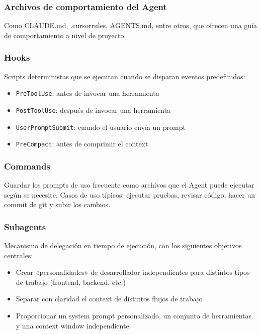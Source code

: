 \documentclass[a4paper]{article}
\begin{document}
\subsubsection{Archivos de comportamiento del Agent}

Como CLAUDE.md, .cursorrules, AGENTS.md, entre otros, que ofrecen una guía de comportamiento a nivel de proyecto.

\subsubsection{Hooks}

Scripts deterministas que se ejecutan cuando se disparan eventos predefinidos:
\begin{itemize}
    \item \texttt{PreToolUse}: antes de invocar una herramienta
    \item \texttt{PostToolUse}: después de invocar una herramienta
    \item \texttt{UserPromptSubmit}: cuando el usuario envía un prompt
    \item \texttt{PreCompact}: antes de comprimir el context
\end{itemize}

\subsubsection{Commands}

Guardar los prompts de uso frecuente como archivos que el Agent puede ejecutar según se necesite. Casos de uso típicos: ejecutar pruebas, revisar código, hacer un commit de git y subir los cambios.

\subsubsection{Subagents}

Mecanismo de delegación en tiempo de ejecución, con los siguientes objetivos centrales:
\begin{itemize}
    \item Crear «personalidades» de desarrollador independientes para distintos tipos de trabajo (frontend, backend, etc.)
    \item Separar con claridad el context de distintos flujos de trabajo
    \item Proporcionar un system prompt personalizado, un conjunto de herramientas y una context window independiente
\end{itemize}
\end{document}

